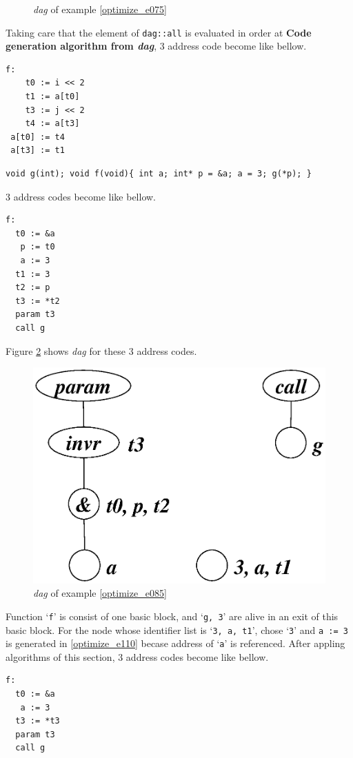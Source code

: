 \begin{Example}
\begin{figure}[htbp]
\begin{center}
\caption{{\em dag} of example \ref{optimize_e075}}
\label{optimize_e076}
\end{center}
\end{figure}
Taking care that the element of {\tt{dag::all}}
is evaluated in order at
{\bf Code generation algorithm from {\em dag}},
3 address code become like bellow.
\begin{verbatim}
f:
    t0 := i << 2
    t1 := a[t0]
    t3 := j << 2
    t4 := a[t3]
 a[t0] := t4
 a[t3] := t1
\end{verbatim}
\end{Example}

\begin{Example}
\label{optimize_e085}
\begin{verbatim}
void g(int); void f(void){ int a; int* p = &a; a = 3; g(*p); }
\end{verbatim}
3 address codes become like bellow.
\begin{verbatim}
f:
  t0 := &a
   p := t0
   a := 3
  t1 := 3
  t2 := p
  t3 := *t2
  param t3
  call g
\end{verbatim}
Figure \ref{optimize_e086} shows {\em dag} for these 3 address codes.
\begin{figure}[htbp]
\begin{center}
\includegraphics[width=0.7\linewidth,height=0.529\linewidth]{opt036.eps}
\caption{{\em dag} of example \ref{optimize_e085}}
\label{optimize_e086}
\end{center}
\end{figure}
Function `{\tt{f}}' is consist of one basic block,
and `{\tt{g, 3}}' are alive in an exit of this basic block.
For the node whose identifier list is `{\tt{3, a, t1}}',
chose `{\tt{3}}' and {\tt{a := 3}} is generated in 
\ref{optimize_e110} becase address of `{\tt{a}}' is referenced.
After appling algorithms of this section,
3 address codes become like bellow.
\begin{verbatim}
f:
  t0 := &a
   a := 3
  t3 := *t3
  param t3
  call g
\end{verbatim}
\end{Example}

